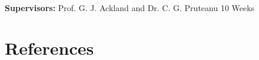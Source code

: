 \documentclass[a4paper,12pt]{article}
\begin{document}
\vfill
{\bf Supervisors:} Prof. G. J. Ackland and Dr. C. G. Pruteanu
\hfill
10 Weeks
\newpage

%
%

\pagestyle{plain}                               %
\setcounter{page}{1}                            %
\tableofcontents                                %
\newpage

%
%

\setlength{\parindent}{0pt}
\setlength{\parskip}{0.5em}









%
%

\setlength{\parindent}{15pt}
\setlength{\parskip}{0pt plus 1pt}

\newpage
\section{References}
\printbibliography[heading=none]

\newpage
\appendix

\end{document}
